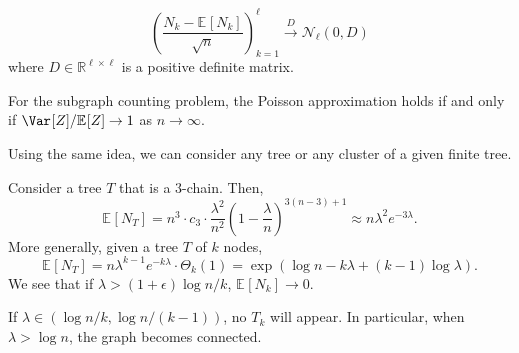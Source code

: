 \begin{theorem}
	\[
		\left( \frac{N_k - \mathbb{E}_{}[N_k] }{\sqrt{n} } \right) _{k=1}^{\ell }
		\overset{D}{\to} \mathcal{N} _\ell (0, D)
	\]
	where \(D \in \mathbb{R} ^{\ell \times \ell }\) is a positive definite matrix.
\end{theorem}

\begin{remark}
	For the subgraph counting problem, the Poisson approximation holds if and only if \(\Var_{}[Z] / \mathbb{E}_{}[Z] \to 1\) as \(n \to \infty \).
\end{remark}

\begin{eg}
	Using the same idea, we can consider any tree or any cluster of a given finite tree.
\end{eg}

Consider a tree \(T\) that is a \(3\)-chain. Then,
\[
	\mathbb{E}_{}[N_T]
	= n^3 \cdot c_3 \cdot \frac{\lambda ^2}{n^2} \left( 1 - \frac{\lambda}{n} \right) ^{3 (n-3) + 1}
	\approx n \lambda ^2 e^{-3\lambda }.
\]
More generally, given a tree \(T\) of \(k\) nodes,
\[
	\mathbb{E}_{}[N_T]
	= n \lambda ^{k-1} e^{-k \lambda } \cdot \Theta _{k} (1)
	= \exp (\log n - k \lambda + (k-1) \log \lambda ).
\]
We see that if \(\lambda > (1 + \epsilon ) \log n / k\), \(\mathbb{E}_{}[N_k] \to 0\).

If \(\lambda \in (\log n / k, \log n / (k-1))\), no \(T_k\) will appear. In particular, when \(\lambda > \log n\), the graph becomes connected.